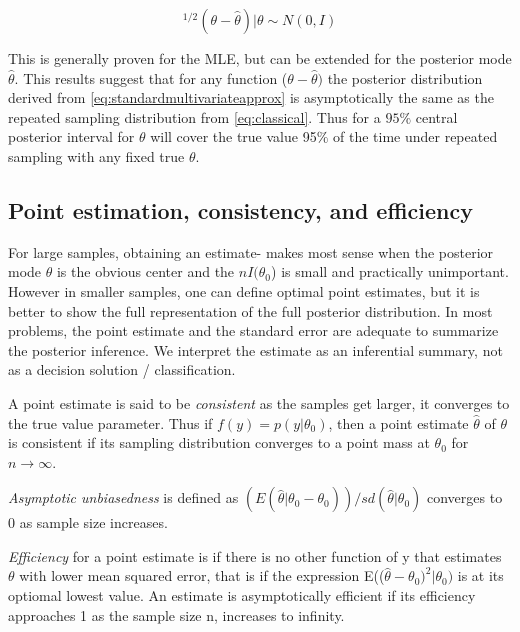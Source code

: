 \documentclass[
]{book}
\theoremstyle{definition}
\theoremstyle{definition}
\theoremstyle{definition}
\theoremstyle{definition}
\theoremstyle{remark}
\begin{document}
\begin{equation}
[I(\hat{\theta})]^{1/2}(\theta-\hat{\theta}) |\theta \sim N(0,I)
\label{eq:classical}
\end{equation}

This is generally proven for the MLE, but can be extended for the posterior mode \(\hat{\theta}\). This results suggest that for any function (\(\theta-\hat{\theta})\) the posterior distribution derived from \eqref{eq:standardmultivariateapprox} is asymptotically the same as the repeated sampling distribution from \eqref{eq:classical}. Thus for a \(95\%\) central posterior interval for \(\theta\) will cover the true value 95\(\%\) of the time under repeated sampling with any fixed true \(\theta.\)

\hypertarget{point-estimation-consistency-and-efficiency}{%
\subsection*{Point estimation, consistency, and efficiency}\label{point-estimation-consistency-and-efficiency}}

For large samples, obtaining an estimate- makes most sense when the posterior mode \(\hat{\theta}\) is the obvious center and the \(nI(\theta_0\)) is small and practically unimportant. However in smaller samples, one can define optimal point estimates, but it is better to show the full representation of the full posterior distribution. In most problems, the point estimate and the standard error are adequate to summarize the posterior inference. We interpret the estimate as an inferential summary, not as a decision solution / classification.

A point estimate is said to be \emph{consistent} as the samples get larger, it converges to the true value parameter. Thus if \(f(y)=p(y|\theta_0)\), then a point estimate \(\hat{\theta}\) of \(\theta\) is consistent if its sampling distribution converges to a point mass at \(\theta_0\) for \(n\to \infty\).

\emph{Asymptotic unbiasedness} is defined as \((E(\hat{\theta}|\theta_0 - \theta_0))/sd(\hat{\theta}|\theta_0)\) converges to 0 as sample size increases.

\emph{Efficiency} for a point estimate is if there is no other function of y that estimates \(\theta\) with lower mean squared error, that is if the expression E((\(\hat{\theta}-\theta_0)^2|\theta_0)\) is at its optiomal lowest value. An estimate is asymptotically efficient if its efficiency approaches 1 as the sample size n, increases to infinity.
\end{document}
